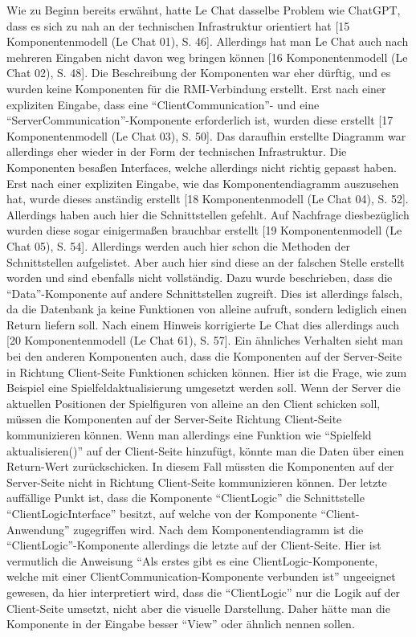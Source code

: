 Wie zu Beginn bereits erwähnt, hatte Le Chat dasselbe Problem wie ChatGPT, dass es sich zu nah an der technischen Infrastruktur orientiert 
hat [15 Komponentenmodell (Le Chat 01), S. 46]. Allerdings hat man Le Chat auch nach mehreren Eingaben nicht davon weg bringen können [16 Komponentenmodell (Le Chat 02), S. 48]. 
Die Beschreibung der Komponenten war eher dürftig, und 
es wurden keine Komponenten für die RMI-Verbindung erstellt. Erst nach einer expliziten Eingabe, dass eine ``ClientCommunication''- und eine 
``ServerCommunication''-Komponente erforderlich ist, wurden diese erstellt [17 Komponentenmodell (Le Chat 03), S. 50]. Das daraufhin erstellte Diagramm war allerdings eher wieder in der 
Form der technischen Infrastruktur. Die Komponenten besaßen Interfaces, welche allerdings nicht richtig gepasst haben. Erst nach einer 
expliziten Eingabe, wie das Komponentendiagramm auszusehen hat, wurde dieses anständig erstellt [18 Komponentenmodell (Le Chat 04), S. 52]. Allerdings haben auch hier die 
Schnittstellen gefehlt. Auf Nachfrage diesbezüglich wurden diese sogar einigermaßen brauchbar erstellt [19 Komponentenmodell (Le Chat 05), S. 54]. Allerdings werden auch hier schon die 
Methoden der Schnittstellen aufgelistet. Aber auch hier sind diese an der falschen Stelle erstellt worden und sind ebenfalls nicht 
vollständig. Dazu wurde beschrieben, dass die ``Data''-Komponente auf andere Schnittstellen zugreift. Dies ist allerdings falsch, da die 
Datenbank ja keine Funktionen von alleine aufruft, sondern lediglich einen Return liefern soll. Nach einem Hinweis korrigierte Le Chat dies 
allerdings auch [20 Komponentenmodell (Le Chat 61), S. 57]. Ein ähnliches Verhalten sieht man bei den anderen Komponenten auch, dass die Komponenten auf der Server-Seite in Richtung 
Client-Seite Funktionen schicken können. Hier ist die Frage, wie zum Beispiel eine Spielfeldaktualisierung umgesetzt werden soll. Wenn der 
Server die aktuellen Positionen der Spielfiguren von alleine an den Client schicken soll, müssen die Komponenten auf der Server-Seite Richtung 
Client-Seite kommunizieren können. Wenn man allerdings eine Funktion wie ``Spielfeld aktualisieren()'' auf der Client-Seite hinzufügt, könnte 
man die Daten über einen Return-Wert zurückschicken. In diesem Fall müssten die Komponenten auf der Server-Seite nicht in Richtung Client-Seite 
kommunizieren können. Der letzte auffällige Punkt ist, dass die Komponente ``ClientLogic'' die Schnittstelle ``ClientLogicInterface'' besitzt, 
auf welche von der Komponente ``Client-Anwendung'' zugegriffen wird. Nach dem Komponentendiagramm ist die ``ClientLogic''-Komponente allerdings die 
letzte auf der Client-Seite. Hier ist vermutlich die Anweisung ``Als erstes gibt es eine ClientLogic-Komponente, welche mit einer 
ClientCommunication-Komponente verbunden ist'' ungeeignet gewesen, da hier interpretiert wird, dass die ``ClientLogic'' nur die Logik auf der 
Client-Seite umsetzt, nicht aber die visuelle Darstellung. Daher hätte man die Komponente in der Eingabe besser ``View'' oder ähnlich nennen 
sollen.

